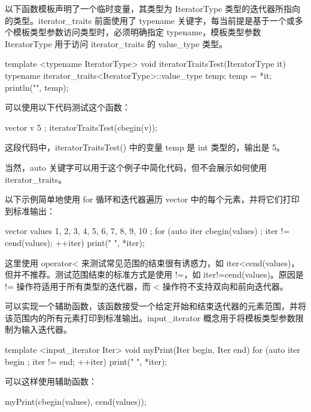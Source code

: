 以下函数模板声明了一个临时变量，其类型为 IteratorType 类型的迭代器所指向的类型。iterator\_traits 前面使用了 typename 关键字，每当前提是基于一个或多个模板类型参数访问类型时，必须明确指定 typename，模板类型参数 IteratorType 用于访问 iterator\_traits 的 value\_type 类型。

\begin{cpp}
template <typename IteratorType>
void iteratorTraitsTest(IteratorType it)
{
    typename iterator_traits<IteratorType>::value_type temp;
    temp = *it;
    println("{}", temp);
}
\end{cpp}

可以使用以下代码测试这个函数：

\begin{cpp}
vector v { 5 };
iteratorTraitsTest(cbegin(v));
\end{cpp}

这段代码中，iteratorTraitsTest() 中的变量 temp 是 int 类型的，输出是 5。

当然，auto 关键字可以用于这个例子中简化代码，但不会展示如何使用 iterator\_traits。


以下示例简单地使用 for 循环和迭代器遍历 vector 中的每个元素，并将它们打印到标准输出：

\begin{cpp}
vector values { 1, 2, 3, 4, 5, 6, 7, 8, 9, 10 };
for (auto iter { cbegin(values) }; iter != cend(values); ++iter) {
    print("{} ", *iter);
}
\end{cpp}

这里使用 operator< 来测试常见范围的结束很有诱惑力，如 iter<cend(values)，但并不推荐。测试范围结束的标准方式是使用 !=，如 iter!=cend(values)。原因是 != 操作符适用于所有类型的迭代器，而 < 操作符不支持双向和前向迭代器。

可以实现一个辅助函数，该函数接受一个给定开始和结束迭代器的元素范围，并将该范围内的所有元素打印到标准输出。input\_iterator 概念用于将模板类型参数限制为输入迭代器。

\begin{cpp}
template <input_iterator Iter>
void myPrint(Iter begin, Iter end)
{
    for (auto iter { begin }; iter != end; ++iter) { print("{} ", *iter); }
}
\end{cpp}

可以这样使用辅助函数：

\begin{cpp}
myPrint(cbegin(values), cend(values));
\end{cpp}

